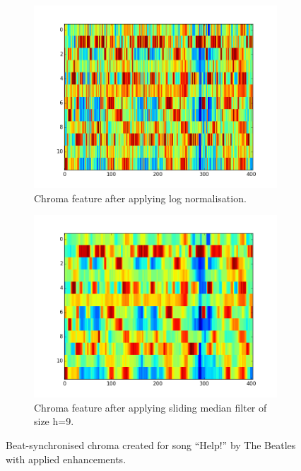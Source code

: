 \begin{figure}[htp]
        \centering
        \begin{subfigure}[b]{0.47\textwidth}
                \includegraphics[width=\textwidth]{Figures/hpcp_synched_log_chroma}
                \caption{Chroma feature after applying log normalisation.}
                \label{fig:logchroma}
        \end{subfigure}%
        \begin{subfigure}[b]{0.47\textwidth}
                \includegraphics[width=\textwidth]{Figures/hpcp_synched_median_chroma}
                \caption{Chroma feature after applying sliding median filter of size h=9.}
                \label{fig:slidingchroma}
        \end{subfigure}
          \caption{Beat-synchronised chroma created for song ``Help!'' by The Beatles with applied enhancements.}
        \label{fig:chromaenhance}
\end{figure}

